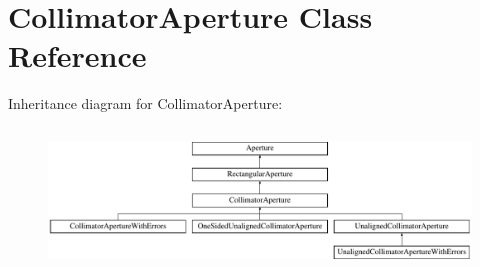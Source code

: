 \hypertarget{classCollimatorAperture}{}\section{Collimator\+Aperture Class Reference}
\label{classCollimatorAperture}
Inheritance diagram for Collimator\+Aperture\+:\begin{figure}[H]
\begin{center}
\leavevmode
\includegraphics[height=3.856750cm]{classCollimatorAperture}
\end{center}
\end{figure}
